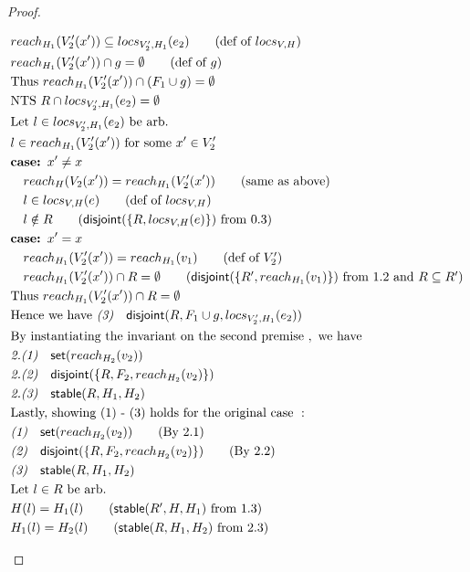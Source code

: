 \documentclass{easychair}
\newcommand{\ms}[1]{\ensuremath{\mathsf{#1}}}
\newcommand{\stable}[1]{\mathsf{stable}(#1)}
\newcommand{\dist}[1]{\mathsf{disjoint}(#1)}
\theoremstyle{definition}
\begin{document}
\begin{proof}
\begin{description}
\begin{align*}
  &reach_{H_1}(V_2'(x')) \subseteq locs_{V_2',H_1}(e_2) \tag{def of $locs_{V,H}$}\\
  &reach_{H_1}(V_2'(x')) \cap g = \emptyset \tag{def of $g$}\\
  &\text{Thus } reach_{H_1}(V_2'(x')) \cap (F_1 \cup g) = \emptyset\\
  &\text{NTS } R \cap locs_{V_2',H_1}(e_2) = \emptyset\\
  &\text{Let } l \in locs_{V_2',H_1}(e_2) \text{ be arb.}\\
  &l \in reach_{H_1}(V_2'(x')) \text{ for some } x' \in V_2'\\
  &\textbf{case: } x' \ne x\\
  &\quad reach_H(V_2(x')) = reach_{H_1}(V_2'(x')) \tag{same as above}\\
  &\quad l \in locs_{V,H}(e) \tag{def of $locs_{V,H}$}\\
  &\quad l \notin R \tag{$\dist{\{R,locs_{V,H}(e)\}}$ from 0.3}\\
  &\textbf{case: } x' = x\\
  &\quad reach_{H_1}(V_2'(x')) = reach_{H_1}(v_1) \tag{def of $V_2'$}\\
  &\quad reach_{H_1}(V_2'(x')) \cap R = \emptyset \tag{$\dist{\{R', reach_{H_1}(v_1)\}}$ from 1.2 and $R \subseteq R'$}\\
  &\text{Thus } reach_{H_1}(V_2'(x')) \cap R = \emptyset\\
  &\text{Hence we have }\emph{(3)}\quad \dist{R,F_1 \cup g,locs_{V_2',H_1}(e_2)}\\
  &\text{By instantiating the invariant on the second premise } , \text{ we have }\\
  &\emph{2.(1)}\quad \ms{set}(reach_{H_2}(v_2))\\
  &\emph{2.(2)}\quad \dist{\{R,F_2,reach_{H_2}(v_2)\}}\\
  &\emph{2.(3)}\quad \stable{R,H_1,H_2}\\
  &\text{Lastly, showing (1) - (3) holds for the original case }:\\
  &\emph{(1)}\quad \ms{set}(reach_{H_2}(v_2)) \tag{By 2.1}\\
  &\emph{(2)}\quad \dist{\{R,F_2,reach_{H_2}(v_2)\}} \tag{By 2.2}\\
  &\emph{(3)}\quad \stable{R,H_1,H_2}\\
  &\text{Let } l \in R \text{ be arb. }\\
  &H(l) = H_1(l) \tag{$\stable{R',H,H_1}$ from 1.3}\\
  &H_1(l) = H_2(l) \tag{$\stable{R,H_1,H_2}$ from 2.3}\\

\end{align*}
\end{description}
\end{proof}
\end{document}
